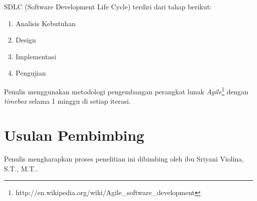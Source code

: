 \documentclass[a4paper, 12pt]{report}
\begin{document}
\begin{flushleft}
SDLC (Software Development Life Cycle) terdiri dari tahap berikut:
\begin{enumerate}
  \item Analisis Kebutuhan
  \item Design
  \item Implementasi
  \item Pengujian
\end{enumerate}

Penulis menggunakan metodologi pengembangan perangkat lunak \textit{Agile}\footnote{http://en.wikipedia.org/wiki/Agile\_software\_development} dengan \textit{timebox} selama 1 minggu di setiap iterasi.

\end{flushleft}

\section*{Usulan Pembimbing}
\onehalfspacing Penulis mengharapkan proses penelitian ini dibimbing oleh ibu Sriyani Violina, S.T., M.T..
\end{document}
